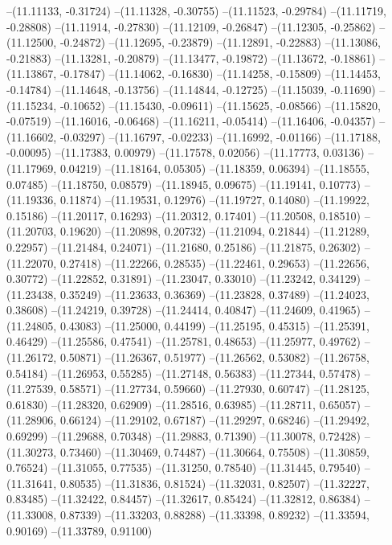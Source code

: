--(11.11133, -0.31724)
--(11.11328, -0.30755)
--(11.11523, -0.29784)
--(11.11719, -0.28808)
--(11.11914, -0.27830)
--(11.12109, -0.26847)
--(11.12305, -0.25862)
--(11.12500, -0.24872)
--(11.12695, -0.23879)
--(11.12891, -0.22883)
--(11.13086, -0.21883)
--(11.13281, -0.20879)
--(11.13477, -0.19872)
--(11.13672, -0.18861)
--(11.13867, -0.17847)
--(11.14062, -0.16830)
--(11.14258, -0.15809)
--(11.14453, -0.14784)
--(11.14648, -0.13756)
--(11.14844, -0.12725)
--(11.15039, -0.11690)
--(11.15234, -0.10652)
--(11.15430, -0.09611)
--(11.15625, -0.08566)
--(11.15820, -0.07519)
--(11.16016, -0.06468)
--(11.16211, -0.05414)
--(11.16406, -0.04357)
--(11.16602, -0.03297)
--(11.16797, -0.02233)
--(11.16992, -0.01166)
--(11.17188, -0.00095)
--(11.17383, 0.00979)
--(11.17578, 0.02056)
--(11.17773, 0.03136)
--(11.17969, 0.04219)
--(11.18164, 0.05305)
--(11.18359, 0.06394)
--(11.18555, 0.07485)
--(11.18750, 0.08579)
--(11.18945, 0.09675)
--(11.19141, 0.10773)
--(11.19336, 0.11874)
--(11.19531, 0.12976)
--(11.19727, 0.14080)
--(11.19922, 0.15186)
--(11.20117, 0.16293)
--(11.20312, 0.17401)
--(11.20508, 0.18510)
--(11.20703, 0.19620)
--(11.20898, 0.20732)
--(11.21094, 0.21844)
--(11.21289, 0.22957)
--(11.21484, 0.24071)
--(11.21680, 0.25186)
--(11.21875, 0.26302)
--(11.22070, 0.27418)
--(11.22266, 0.28535)
--(11.22461, 0.29653)
--(11.22656, 0.30772)
--(11.22852, 0.31891)
--(11.23047, 0.33010)
--(11.23242, 0.34129)
--(11.23438, 0.35249)
--(11.23633, 0.36369)
--(11.23828, 0.37489)
--(11.24023, 0.38608)
--(11.24219, 0.39728)
--(11.24414, 0.40847)
--(11.24609, 0.41965)
--(11.24805, 0.43083)
--(11.25000, 0.44199)
--(11.25195, 0.45315)
--(11.25391, 0.46429)
--(11.25586, 0.47541)
--(11.25781, 0.48653)
--(11.25977, 0.49762)
--(11.26172, 0.50871)
--(11.26367, 0.51977)
--(11.26562, 0.53082)
--(11.26758, 0.54184)
--(11.26953, 0.55285)
--(11.27148, 0.56383)
--(11.27344, 0.57478)
--(11.27539, 0.58571)
--(11.27734, 0.59660)
--(11.27930, 0.60747)
--(11.28125, 0.61830)
--(11.28320, 0.62909)
--(11.28516, 0.63985)
--(11.28711, 0.65057)
--(11.28906, 0.66124)
--(11.29102, 0.67187)
--(11.29297, 0.68246)
--(11.29492, 0.69299)
--(11.29688, 0.70348)
--(11.29883, 0.71390)
--(11.30078, 0.72428)
--(11.30273, 0.73460)
--(11.30469, 0.74487)
--(11.30664, 0.75508)
--(11.30859, 0.76524)
--(11.31055, 0.77535)
--(11.31250, 0.78540)
--(11.31445, 0.79540)
--(11.31641, 0.80535)
--(11.31836, 0.81524)
--(11.32031, 0.82507)
--(11.32227, 0.83485)
--(11.32422, 0.84457)
--(11.32617, 0.85424)
--(11.32812, 0.86384)
--(11.33008, 0.87339)
--(11.33203, 0.88288)
--(11.33398, 0.89232)
--(11.33594, 0.90169)
--(11.33789, 0.91100)
